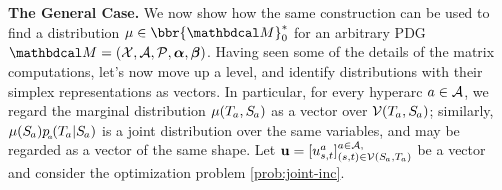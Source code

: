 \documentclass[twoside]{article}
\begin{document}
\textbf{The General Case.}
We now show how the same construction can be used to find
 a distribution $\mu \in \bbr{\dg M}^*_0$
for an arbitrary PDG $\dg M = (\X, \Ar, \mathcal P, \balpha, \bbeta)$.
Having seen some of the details of the matrix computations, let's now move up a level, 
and identify distributions with their simplex representations as vectors. 
In particular, for every hyperarc $a \in \mathcal A$, we regard the marginal distribution $\mu(\Tgt a, \Src a)$ as a vector over $\V(\Tgt a, \Src a)$;
similarly, $\mu(\Src a)p\ssub a(\Tgt a | \Src a)$ is a joint distribution over the same variables, and may be regarded as a vector of the same shape. 
%
Let $\mat u = [u^a_{s,t}]^{a \in \Ar,}_{ (s,t) \in \V(\Src a, \Tgt a)}$
be a vector
%
and consider the optimization problem \eqref{prob:joint-inc}.
\end{document}
